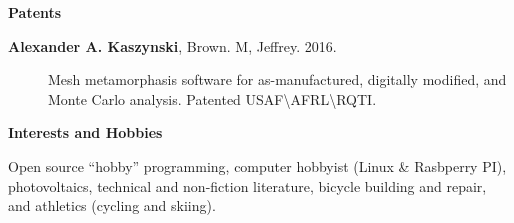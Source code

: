 \documentclass[letterpaper,11pt]{article}
\newcommand{\resheading}[1]{{\large \colorbox{mygrey}{\begin{minipage}{\textwidth}{\textbf{#1 \vphantom{p\^{E}}}}\end{minipage}}}}
\begin{document}
\resheading{Patents}
\begin{description}
\item[\textbf{Alexander A. Kaszynski}, Brown. M, Jeffrey.  2016.]
Mesh metamorphasis software for as-manufactured, digitally modified, and Monte Carlo analysis.
Patented USAF\textbackslash AFRL\textbackslash RQTI.
\end{description}

\resheading{Interests and Hobbies}
\begin{description}
Open source ``hobby'' programming, computer hobbyist (Linux \& Rasbperry PI), photovoltaics, technical and non-fiction literature, bicycle building and repair, and athletics (cycling and skiing).
\end{description}
\end{document}
